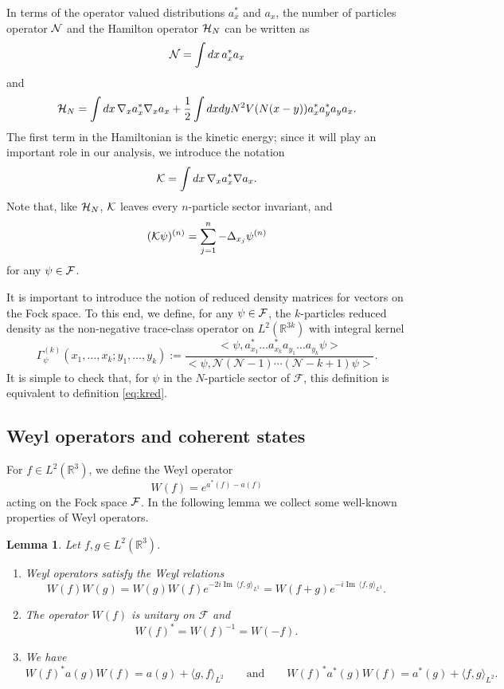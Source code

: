 \documentclass[11pt,a4paper]{article}
\newtheorem{lem}[thm]{Lemma}
\newcommand{\done}{}
\newcommand{\bR}{{\mathbb R}}
\newcommand{\cF}{{\cal F}}
\newcommand{\cK}{{\cal K}}
\newcommand{\cH}{{\cal H}}
\newcommand{\cN}{{\cal N}}
\newcommand{\R}{\mathbb{R}}
\newcommand{\fock}{\mathcal{F}}		%
\newcommand{\Ncal}{\mathcal{N}}		%
\newcommand{\scal}[2]{\big<#1,#2\big>} %
\renewcommand{\Im}{\operatorname{Im}\,} 	%
\begin{document}
In terms of the operator valued distributions $a_x^*$ and $a_x$, the number of particles operator $\cN$ 
and the Hamilton operator $\cH_N$ can be written as
\[ \cN = \int dx \, a_x^* a_x \]
and 
\begin{equation}\label{eq:ham-F} \cH_N = \int dx \, \nabla_x a_x^* \nabla_x a_x + \frac{1}{2} \int dx dy N^2 V(N (x-y)) a^*_x a^*_y a_y a_x. \end{equation}
The first term in the Hamiltonian is the kinetic energy; since it will play an important role in our analysis, we introduce the notation 
\[ \cK = \int dx \, \nabla_x a_x^* \nabla a_x. \]
Note that, like $\cH_N$, $\cK$ leaves every $n$-particle sector invariant, and
\[ (\cK \psi)^{(n)} = \sum_{j=1}^n -\Delta_{x_j} \psi^{(n)} \]
for any $\psi \in \cF$. 

It is important to introduce the notion of reduced density matrices for vectors on the Fock space. To this end, we define, for any $\psi \in \cF$, the $k$-particles reduced density as the non-negative trace-class
operator on $L^2 (\bR^{3k})$ with integral kernel 
\begin{equation} \label{fock_density}
\Gamma_{\psi}^{(k)}(x_1, \dots, x_k ; y_1, \dots , y_k) := \frac{\scal{\psi}{a^*_{x_1} \dots a^*_{x_k} a_{y_1} \dots a_{y_k} \psi}}{\scal{\psi}{\Ncal(\Ncal-1)\cdots(\Ncal-k+1)\psi}}.\done
\end{equation}
It is simple to check that, for $\psi$ in the $N$-particle sector of $\fock$, this definition is equivalent to definition \eqref{eq:kred}.

\subsection{Weyl operators and coherent states}

For $f \in L^2(\R^3)$, we define the Weyl operator 
\[
  W(f) = e^{a^*(f) - a(f)}\done
\]
acting on the Fock space $\cF$. In the following lemma we collect some well-known properties of Weyl operators.
\begin{lem}\label{l:W}
  Let $f, g \in L^2(\R^3)$.
  \begin{enumerate}
    \item \label{l:W1} Weyl operators satisfy the Weyl relations
      \[
        W(f) W(g) = W(g) W(f) e^{-2i \Im \langle f, g \rangle_{L^2}} = W(f+g)
        e^{-i \Im \langle f, g \rangle_{L^2}}.
      \]
    \item \label{l:W2} The operator $W(f)$ is unitary on $\mathcal{F}$ and
      \[
        W(f)^* = W(f)^{-1} = W(-f).
      \]
    \item \label{l:W3} We have
      \begin{equation}\label{eq:W3}
        W(f)^* a (g)  W(f) = a (g) + \langle g, f \rangle_{L^2}  \qquad \text{and} \qquad W(f)^* a^* (g)
        W(f) = a^* (g) + \langle f, g \rangle_{L^2}.
      \end{equation}
 \end{enumerate}
\end{lem}
\end{document}
